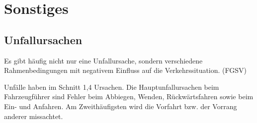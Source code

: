 
\section{Sonstiges}




\subsection{Unfallursachen}

Es gibt häufig nicht nur eine Unfallursache, sondern verschiedene Rahmenbedingungen mit negativem Einfluss auf die Verkehrssituation. (FGSV)

Unfälle haben im Schnitt 1,4 Ursachen. Die Hauptunfallursachen beim Fahrzeugführer sind Fehler beim Abbiegen, Wenden, Rückwärtsfahren sowie beim Ein- und Anfahren. Am Zweithäufigsten wird die Vorfahrt bzw. der Vorrang anderer missachtet. \parencite[S.149]{StatistischesBundesamt.2016}